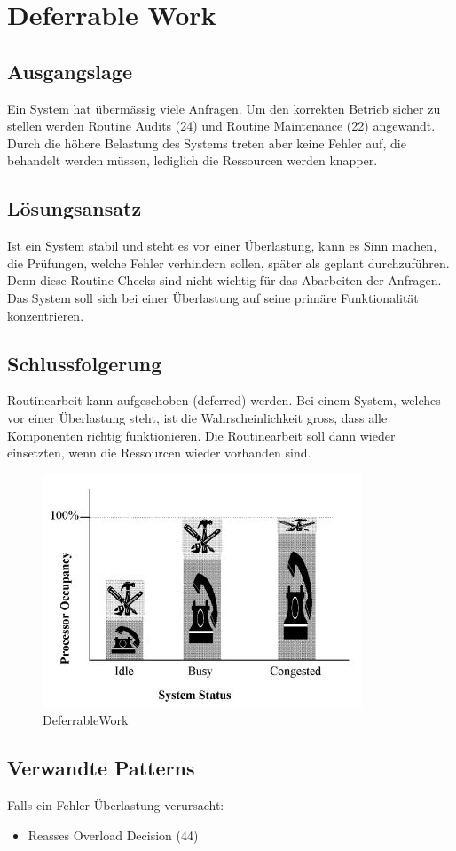 \section{Deferrable Work}

\subsection{Ausgangslage}

Ein System hat übermässig viele Anfragen. Um den korrekten Betrieb sicher zu stellen werden Routine Audits (24) und Routine Maintenance (22) angewandt. Durch die höhere Belastung des Systems treten aber keine Fehler auf, die behandelt werden müssen, lediglich die Ressourcen werden knapper.

\subsection{Lösungsansatz}

Ist ein System stabil und steht es vor einer Überlastung, kann es Sinn machen, die Prüfungen, welche Fehler verhindern sollen, später als geplant durchzuführen. Denn diese Routine-Checks sind nicht wichtig für das Abarbeiten der Anfragen. Das System soll sich bei einer Überlastung auf seine primäre Funktionalität konzentrieren.

\subsection{Schlussfolgerung}

Routinearbeit kann aufgeschoben (deferred) werden. Bei einem System, welches vor einer Überlastung steht, ist die Wahrscheinlichkeit gross, dass alle Komponenten richtig funktionieren. Die Routinearbeit soll dann wieder einsetzten, wenn die Ressourcen wieder vorhanden sind.

\begin{figure}[H]
	\centering
	\includegraphics[width=\textwidth]{content/faulttolerance/images/DeferrableWork.JPG}
	\caption{DeferrableWork}
\end{figure}


\subsection{Verwandte Patterns}

Falls ein Fehler Überlastung verursacht:
\begin{itemize}
	\item Reasses Overload Decision (44)
\end{itemize}



